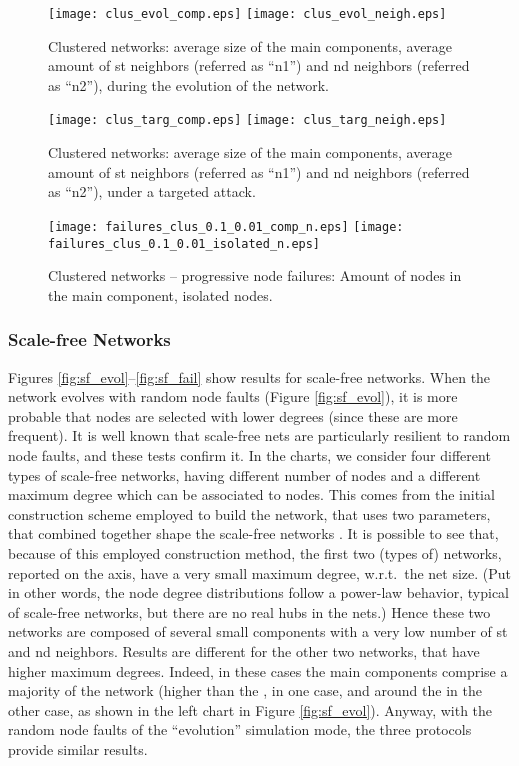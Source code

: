 \documentclass[10pt, conference, compsocconf]{IEEEtran}
\begin{document}
\begin{figure*}[t]
   \centering
   \texttt{[image: clus\_evol\_comp.eps]}
   \texttt{[image: clus\_evol\_neigh.eps]}
   \caption{Clustered networks: average size of the main components, average amount of st neighbors (referred as ``n1'') and nd neighbors (referred as ``n2''), during the evolution of the network.}
   \label{fig:clus_evol}
\end{figure*}

\begin{figure*}[t]
   \centering
   \texttt{[image: clus\_targ\_comp.eps]}
   \texttt{[image: clus\_targ\_neigh.eps]}
   \caption{Clustered networks: average size of the main components, average amount of st neighbors (referred as ``n1'') and nd neighbors (referred as ``n2''), under a targeted attack.}
   \label{fig:clus_targ}
\end{figure*}

\begin{figure*}[t]
   \centering
   \texttt{[image: failures\_clus\_0.1\_0.01\_comp\_n.eps]}
         \hspace{1.5cm}
   \texttt{[image: failures\_clus\_0.1\_0.01\_isolated\_n.eps]}
   \caption{Clustered networks -- progressive node failures: Amount of nodes in the main component, isolated nodes.}
   \label{fig:clus_fail}
\end{figure*}

\subsubsection{Scale-free Networks}
Figures \ref{fig:sf_evol}--\ref{fig:sf_fail} show results for scale-free networks.
When the network evolves with random node faults (Figure \ref{fig:sf_evol}), it is more probable that nodes are selected with lower degrees (since these are more frequent). It is well known that scale-free nets are particularly resilient to random node faults, and these tests confirm it. 
In the charts, we consider four different types of scale-free networks, having different number of nodes and a different maximum degree which can be associated to nodes. This comes from the initial construction scheme employed to build the network, that uses two parameters, that combined together shape the scale-free networks \cite{Aiello00arandom}.
It is possible to see that, because of this employed construction method, the first two (types of) networks, reported on the  axis, have a very small maximum degree, w.r.t.~the net size. (Put in other words, 
the node degree distributions follow a power-law behavior, typical of scale-free networks, but there are no real hubs in the nets.) Hence these two networks are composed of several small components with a very low number of st and nd neighbors. 
Results are different for the other two networks, that have higher maximum degrees. Indeed, in these cases the main components comprise a majority of the network (higher than the , in one case, and around the  in the other case, as shown in the left chart in Figure \ref{fig:sf_evol}).
Anyway, with the random node faults of the ``evolution'' simulation mode, the three protocols provide similar results.
\end{document}
